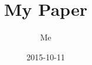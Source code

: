 




% 

\documentclass[a4paper, 12pt]{article}
\title{My Paper}
\author{Me}
\date{2015-10-11}
\usepackage[utf8]{inputenc}
\usepackage{biblatex}



\maketitle
\newpage
{}
\newpage

\paragraph{Introdution}
Trying to work a biblatex example here \cite{dirac}.

